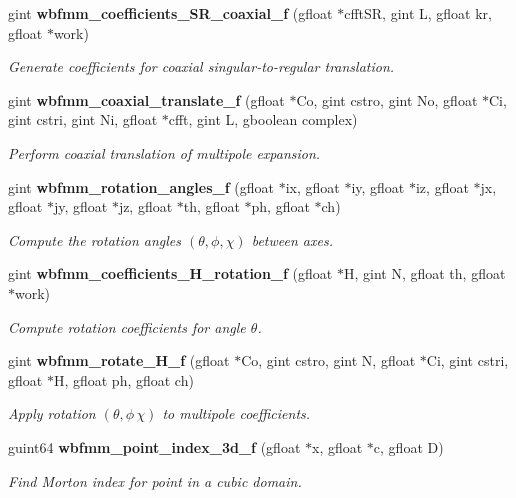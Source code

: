 \begin{DoxyCompactItemize}
gint \textbf{ wbfmm\+\_\+coefficients\+\_\+\+S\+R\+\_\+coaxial\+\_\+f} (gfloat $\ast$cfft\+SR, gint L, gfloat kr, gfloat $\ast$work)
\begin{DoxyCompactList}\small\item\em Generate coefficients for coaxial singular-\/to-\/regular translation. \end{DoxyCompactList}\item 
gint \textbf{ wbfmm\+\_\+coaxial\+\_\+translate\+\_\+f} (gfloat $\ast$Co, gint cstro, gint No, gfloat $\ast$Ci, gint cstri, gint Ni, gfloat $\ast$cfft, gint L, gboolean complex)
\begin{DoxyCompactList}\small\item\em Perform coaxial translation of multipole expansion. \end{DoxyCompactList}\item 
gint \textbf{ wbfmm\+\_\+rotation\+\_\+angles\+\_\+f} (gfloat $\ast$ix, gfloat $\ast$iy, gfloat $\ast$iz, gfloat $\ast$jx, gfloat $\ast$jy, gfloat $\ast$jz, gfloat $\ast$th, gfloat $\ast$ph, gfloat $\ast$ch)
\begin{DoxyCompactList}\small\item\em Compute the rotation angles $(\theta,\phi,\chi)$ between axes. \end{DoxyCompactList}\item 
gint \textbf{ wbfmm\+\_\+coefficients\+\_\+\+H\+\_\+rotation\+\_\+f} (gfloat $\ast$H, gint N, gfloat th, gfloat $\ast$work)
\begin{DoxyCompactList}\small\item\em Compute rotation coefficients for angle $\theta$. \end{DoxyCompactList}\item 
gint \textbf{ wbfmm\+\_\+rotate\+\_\+\+H\+\_\+f} (gfloat $\ast$Co, gint cstro, gint N, gfloat $\ast$Ci, gint cstri, gfloat $\ast$H, gfloat ph, gfloat ch)
\begin{DoxyCompactList}\small\item\em Apply rotation $(\theta,\phi\,\chi)$ to multipole coefficients. \end{DoxyCompactList}\item 
guint64 \textbf{ wbfmm\+\_\+point\+\_\+index\+\_\+3d\+\_\+f} (gfloat $\ast$x, gfloat $\ast$c, gfloat D)
\begin{DoxyCompactList}\small\item\em Find Morton index for point in a cubic domain. \end{DoxyCompactList}\item 

\end{DoxyCompactItemize}

